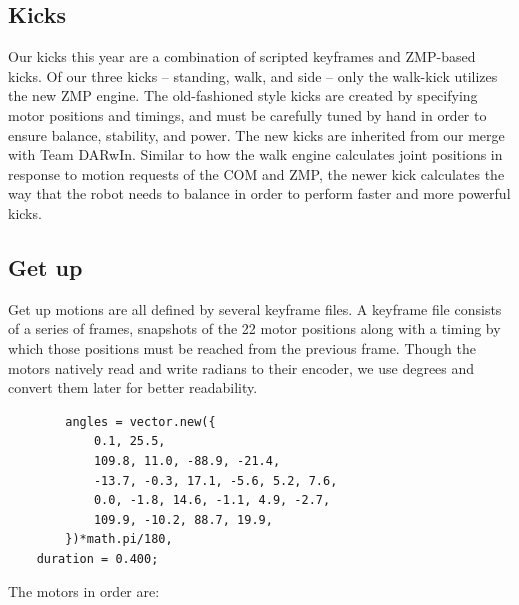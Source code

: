 \documentclass{article}
\begin{document}
\subsection{Kicks}
	  Our kicks this year are a combination of scripted keyframes and ZMP-based kicks. Of our three kicks -- standing, walk, and side -- only the walk-kick utilizes the new ZMP engine. The old-fashioned style kicks are created by specifying motor positions and timings, and must be carefully tuned by hand in order to ensure balance, stability, and power. The new kicks are inherited from our merge with Team DARwIn. Similar to how the walk engine calculates joint positions in response to motion requests of the COM and ZMP, the newer kick calculates the way that the robot needs to balance in order to perform faster and more powerful kicks.  

  
\subsection{Get up}
	Get up motions are all defined by several keyframe files. A keyframe file consists of a series of frames, snapshots of the 22 motor positions along with a timing by which those positions must be reached from the previous frame. Though the motors natively read and write radians to their encoder, we use degrees and convert them later for better readability.
	
	\begin{lstlisting}
  	  	angles = vector.new({
	  		0.1, 25.5,
		  	109.8, 11.0, -88.9, -21.4,
  			-13.7, -0.3, 17.1, -5.6, 5.2, 7.6,
	  		0.0, -1.8, 14.6, -1.1, 4.9, -2.7,
		  	109.9, -10.2, 88.7, 19.9,
  	  	})*math.pi/180,
	duration = 0.400;
	\end{lstlisting}

  	The motors in order are:
\end{document}
